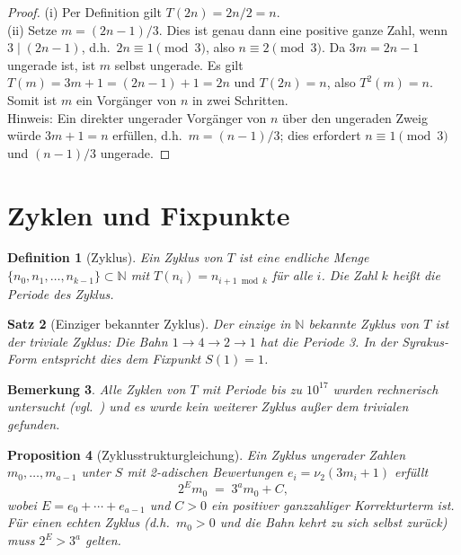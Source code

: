 \documentclass[12pt,a4paper]{article}
\newtheorem{theorem}{Satz}[section]
\newtheorem{proposition}[theorem]{Proposition}
\newtheorem{definition}[theorem]{Definition}
\newtheorem{remark}[theorem]{Bemerkung}
\begin{document}
\begin{proof}
(i) Per Definition gilt $T(2n) = 2n/2 = n$.\\
(ii) Setze $m = (2n-1)/3$. Dies ist genau dann eine positive ganze Zahl, wenn
$3 \mid (2n-1)$, d.h.\ $2n \equiv 1 \pmod{3}$, also $n \equiv 2 \pmod{3}$.
Da $3m = 2n-1$ ungerade ist, ist $m$ selbst ungerade. Es gilt
$T(m) = 3m + 1 = (2n-1) + 1 = 2n$ und $T(2n) = n$, also $T^2(m) = n$.
Somit ist $m$ ein Vorgänger von $n$ in zwei Schritten.\\
Hinweis: Ein direkter ungerader Vorgänger von $n$ über den ungeraden Zweig
würde $3m + 1 = n$ erfüllen, d.h.\ $m = (n-1)/3$; dies erfordert $n \equiv 1 \pmod{3}$
und $(n-1)/3$ ungerade.
\end{proof}

\section{Zyklen und Fixpunkte}

\begin{definition}[Zyklus]\label{def:cycle}
Ein \emph{Zyklus} von $T$ ist eine endliche Menge $\{n_0, n_1, \ldots, n_{k-1}\} \subset \mathbb{N}$
mit $T(n_i) = n_{i+1 \bmod k}$ für alle $i$. Die Zahl $k$ heißt die \emph{Periode}
des Zyklus.
\end{definition}

\begin{theorem}[Einziger bekannter Zyklus]\label{thm:cycle}
Der einzige in $\mathbb{N}$ bekannte Zyklus von $T$ ist der \emph{triviale Zyklus}:
Die Bahn $1 \to 4 \to 2 \to 1$ hat die Periode 3. In der Syrakus-Form entspricht dies
dem Fixpunkt $S(1) = 1$.
\end{theorem}

\begin{remark}\label{rem:cycle_search}
Alle Zyklen von $T$ mit Periode bis zu $10^{17}$ wurden rechnerisch untersucht
(vgl.\ \cite{Leavens1992}) und es wurde kein weiterer Zyklus außer dem trivialen gefunden.
\end{remark}

\begin{proposition}[Zyklusstrukturgleichung]\label{prop:cycle_eq}
Ein Zyklus ungerader Zahlen $m_0, \ldots, m_{a-1}$ unter $S$ mit 2-adischen Bewertungen
$e_i = \nu_2(3m_i + 1)$ erfüllt
\begin{equation}\label{eq:cycle_cond}
  2^E m_0 \;=\; 3^a m_0 + C,
\end{equation}
wobei $E = e_0 + \cdots + e_{a-1}$ und $C > 0$ ein positiver ganzzahliger Korrekturterm ist.
Für einen echten Zyklus (d.h.\ $m_0 > 0$ und die Bahn kehrt zu sich selbst zurück) muss
$2^E > 3^a$ gelten.
\end{proposition}
\end{document}
